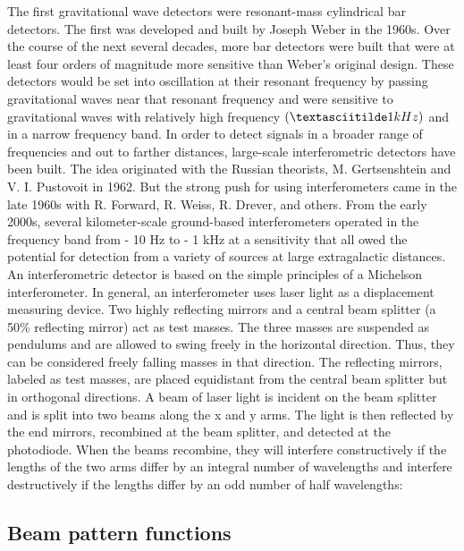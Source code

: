 \documentclass[binding=0.6cm, LaM]{sapthesis}
\begin{document}
The first gravitational wave detectors were resonant-mass cylindrical bar detectors. The first was developed and built by Joseph Weber in the 1960s.
Over the course of the next several decades, more bar detectors were built that were at least four orders of magnitude more sensitive than Weber’s original design.
These detectors would be set into oscillation at their resonant frequency by passing gravitational waves near that resonant frequency and were sensitive to gravitational waves with relatively high
 frequency $(\textasciitilde 1 kHz)$ and in a narrow frequency band. In order to detect signals in a broader range of frequencies and out to farther distances, large-scale interferometric detectors
 have been built. The idea originated with the Russian theorists, M. Gertsenshtein and V. I. Pustovoit in 1962. But the strong push for using interferometers came in the late 1960s with
R. Forward, R. Weiss, R. Drever, and others. From the early 2000s, several kilometer-scale ground-based interferometers operated in the frequency band from - 10 Hz to - 1 kHz at a sensitivity that all
owed the potential for detection from a variety of sources at large extragalactic distances.
An interferometric detector is based on the simple principles of a Michelson interferometer. In general, an interferometer uses laser light as a displacement measuring device.
Two highly reflecting mirrors and a central beam splitter (a 50\% reflecting mirror) act as test masses. The three masses are suspended as pendulums and are allowed to swing freely in the horizontal
 direction. Thus, they can be considered freely falling masses in that direction. The reflecting mirrors,  labeled as test masses, are placed equidistant from the central beam splitter but in
orthogonal directions.
A beam of laser light is incident on the beam splitter and is split into two beams along the x and y arms. The light is then reflected by the end mirrors, recombined at the beam splitter,
 and detected at the photodiode. When the beams recombine, they will interfere constructively if the lengths of the two arms differ by an integral number of wavelengths and interfere destructively
if the lengths differ by an odd number of half wavelengths:
%


\subsection{Beam pattern functions}
\end{document}
